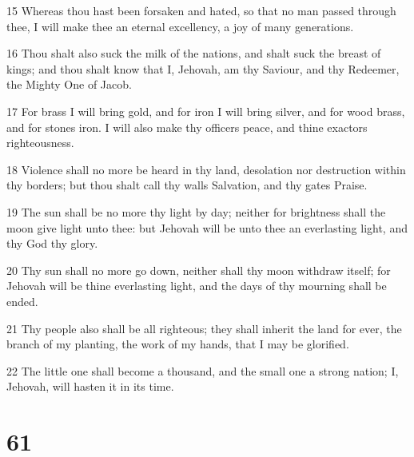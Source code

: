 \par 15 Whereas thou hast been forsaken and hated, so that no man passed through thee, I will make thee an eternal excellency, a joy of many generations.
\par 16 Thou shalt also suck the milk of the nations, and shalt suck the breast of kings; and thou shalt know that I, Jehovah, am thy Saviour, and thy Redeemer, the Mighty One of Jacob.
\par 17 For brass I will bring gold, and for iron I will bring silver, and for wood brass, and for stones iron. I will also make thy officers peace, and thine exactors righteousness.
\par 18 Violence shall no more be heard in thy land, desolation nor destruction within thy borders; but thou shalt call thy walls Salvation, and thy gates Praise.
\par 19 The sun shall be no more thy light by day; neither for brightness shall the moon give light unto thee: but Jehovah will be unto thee an everlasting light, and thy God thy glory.
\par 20 Thy sun shall no more go down, neither shall thy moon withdraw itself; for Jehovah will be thine everlasting light, and the days of thy mourning shall be ended.
\par 21 Thy people also shall be all righteous; they shall inherit the land for ever, the branch of my planting, the work of my hands, that I may be glorified.
\par 22 The little one shall become a thousand, and the small one a strong nation; I, Jehovah, will hasten it in its time.

\chapter{61}

